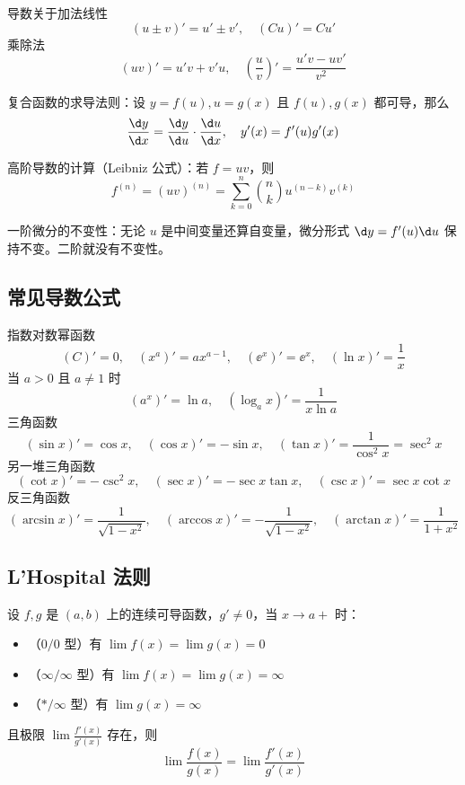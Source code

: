 导数关于加法线性
\[ (u \pm v)' = u' \pm v', \quad  (Cu)' = Cu' \]
乘除法
\[ (uv)' = u'v + v'u, \quad \left(\frac{u}{v}\right)' = \frac{u'v - uv'}{v^2} \]

复合函数的求导法则：设 $y = f(u), u = g(x)$ 且 $f(u), g(x)$ 都可导，那么
\[ \frac{\d y}{\d x} = \frac{\d y}{\d u} \cdot \frac{\d u}{\d x}, \quad y'(x) = f'(u) g'(x) \]

高阶导数的计算（Leibniz 公式）：若 $f = uv$，则
\[ f^{(n)} = (uv)^{(n)} = \sum_{k=0}^{n} \binom{n}{k} u^{(n-k)}v^{(k)} \]

一阶微分的不变性：无论 $u$ 是中间变量还算自变量，微分形式 $\d y = f'(u) \d u$ 保持不变。二阶就没有不变性。

\subsection{常见导数公式}

指数对数幂函数
\[  (C)' = 0, \quad \left(x^a\right)' = a x^{a-1}, \quad
	\left(\ee^x\right)' = \ee^x, \quad
	\left(\ln x\right)' = \frac{1}{x} \]
当 $a > 0$ 且 $a \neq 1$ 时
\[ \left(a^x\right)' = \ln a, \quad \left(\log_a x\right)' = \frac{1}{x \ln a}  \]
三角函数
\[ \left(\sin x\right)' = \cos x, \quad \left(\cos x\right)' = -\sin x, \quad \left(\tan x\right)' = \frac{1}{\cos^2 x} = \sec^2 x \]
另一堆三角函数
\[ \left(\cot x\right)' = -\csc^2 x, \quad \left(\sec x\right)' = -\sec x\tan x, \quad \left(\csc x\right)' = \sec x \cot x \]
反三角函数
\[
	\left(\arcsin x\right)' = \frac{1}{\sqrt{1-x^2}} , \quad
	\left(\arccos x\right)' = -\frac{1}{\sqrt{1-x^2}}, \quad
	\left(\arctan x\right)' = \frac{1}{1+x^2}
\]

\subsection{L'Hospital 法则}

\begin{theorem}[L'Hospital 法则]
	设 $f,g$ 是 $(a,b)$ 上的连续可导函数，$g' \neq 0$，当 $x \to a+$ 时：
	\begin{itemize}
		\item （$0/0$ 型）有 $\lim f(x) = \lim g(x) = 0$
		\item （$\infty/\infty$ 型）有 $\lim f(x) = \lim g(x) = \infty$
		\item （$\ast/\infty$ 型）有 $\lim g(x) = \infty$
	\end{itemize}
	且极限 $\lim \frac{f'(x)}{g'(x)}$ 存在，则
	\[ \lim \frac{f(x)}{g(x)} = \lim \frac{f'(x)}{g'(x)} \]
\end{theorem}

